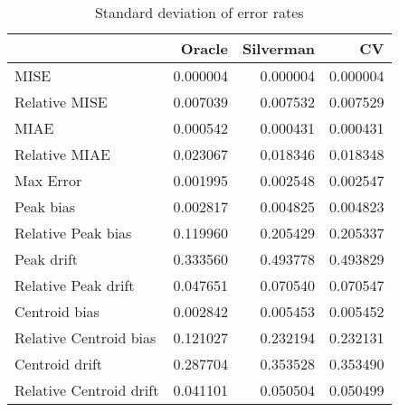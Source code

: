 \begin{table}[ht]
\centering
\begin{tabular}{lrrr}
  \hline
 & Oracle & Silverman & CV \\ 
  \hline
MISE & 0.000004 & 0.000004 & 0.000004 \\ 
  Relative MISE & 0.007039 & 0.007532 & 0.007529 \\ 
  MIAE & 0.000542 & 0.000431 & 0.000431 \\ 
  Relative MIAE & 0.023067 & 0.018346 & 0.018348 \\ 
  Max Error & 0.001995 & 0.002548 & 0.002547 \\ 
  Peak bias & 0.002817 & 0.004825 & 0.004823 \\ 
  Relative Peak bias & 0.119960 & 0.205429 & 0.205337 \\ 
  Peak drift & 0.333560 & 0.493778 & 0.493829 \\ 
  Relative Peak drift & 0.047651 & 0.070540 & 0.070547 \\ 
  Centroid bias & 0.002842 & 0.005453 & 0.005452 \\ 
  Relative Centroid bias & 0.121027 & 0.232194 & 0.232131 \\ 
  Centroid drift & 0.287704 & 0.353528 & 0.353490 \\ 
  Relative Centroid drift & 0.041101 & 0.050504 & 0.050499 \\ 
   \hline
\end{tabular}
\caption{Standard deviation of error rates} 
\label{tbl:stddev_error_rates}
\end{table}
